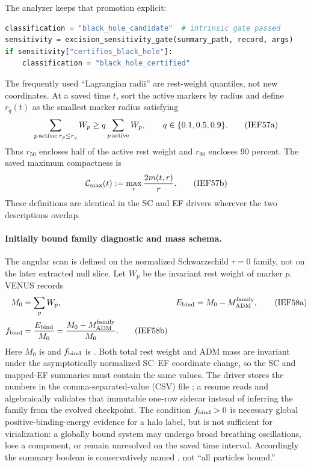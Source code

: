 The analyzer keeps that promotion explicit:
\begin{lstlisting}[language=Python,basicstyle=\ttfamily\scriptsize]
classification = "black_hole_candidate"  # intrinsic gate passed
sensitivity = excision_sensitivity_gate(summary_path, record, args)
if sensitivity["certifies_black_hole"]:
    classification = "black_hole_certified"
\end{lstlisting}

The frequently used ``Lagrangian radii'' are rest-weight quantiles, not new
coordinates.  At a saved time \(t\), sort the active markers by radius and
define \(r_q(t)\) as the smallest marker radius satisfying
\[
 \sum_{p\,{\rm active}:\,r_p\le r_q}W_p
 \ge q\sum_{p\,{\rm active}}W_p,
 \qquad q\in\{0.1,0.5,0.9\}.                           \tag{IEF57a}
\]
Thus \(r_{50}\) encloses half of the active rest weight and \(r_{90}\)
encloses 90 percent.  The saved maximum compactness is
\[
 {\cal C}_{\max}(t):=\max_r\frac{2m(t,r)}r.           \tag{IEF57b}
\]
These definitions are identical in the SC and EF drivers wherever the two
descriptions overlap.

\paragraph{Initially bound family diagnostic and mass schema.}
The angular scan is defined on the normalized Schwarzschild \(\tau=0\)
family, not on the later extracted null slice.  Let \(W_p\) be the invariant
rest weight of marker \(p\).  VENUS records
\begin{align}
 M_0&=\sum_p W_p,
 &E_{\rm bind}&=M_0-M_{\rm ADM}^{\rm family},             \tag{IEF58a}\\
 f_{\rm bind}&=\frac{E_{\rm bind}}{M_0}
 =\frac{M_0-M_{\rm ADM}^{\rm family}}{M_0}.              \tag{IEF58b}
\end{align}
Here \(M_0\) is
 and \(f_{\rm bind}\) is
.  Both total rest weight and ADM mass
are invariant under the asymptotically normalized SC--EF coordinate change,
so the SC and mapped-EF summaries must contain the same values.  The driver
stores the numbers in the comma-separated-value (CSV) file
; a resume reads and
algebraically validates that immutable one-row sidecar instead of inferring
the family from the evolved checkpoint.  The condition \(f_{\rm bind}>0\) is
necessary global positive-binding-energy evidence for a halo label, but is
not sufficient for virialization: a globally bound system may undergo broad
breathing oscillations, lose a component, or remain unresolved on the saved
time interval.  Accordingly the summary boolean is conservatively named
, not ``all particles bound.''

